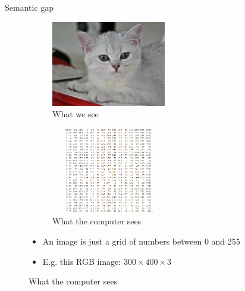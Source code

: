 \documentclass[dvipsnames]{beamer}
\begin{document}
\begin{frame}{Semantic gap}
\begin{figure}
  \begin{subfigure}{0.45\linewidth} 
    \centering
    \includegraphics[width=5cm]{figures/cat4.jpg}
    \caption*{What we see}
    \label{fig:subfig1}
  \end{subfigure}
  \hfill
  \begin{subfigure}{0.45\linewidth}
    \centering
   \includegraphics[width=5cm, height=3.75cm]{figures/test_2.png}
    \caption*{What the computer sees}
    \label{fig:subfig2}
  \end{subfigure}
	\begin{itemize}
		\item An image is just a grid of numbers between 0 and 255
		\item E.g. this RGB image: $300\times 400 \times 3$
	\end{itemize}
  \label{fig:main}
\end{figure}
\end{frame}
\end{document}
